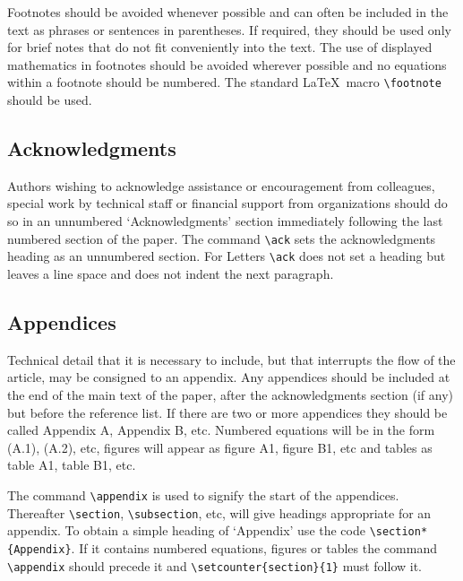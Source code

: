 \documentclass[12pt]{iopart}
\begin{document}
Footnotes should be avoided whenever possible and can often be included in the text as phrases or sentences in parentheses. If required, they should be used only for brief notes that do not fit conveniently into the text. The use of 
displayed mathematics in footnotes should be avoided wherever possible and no equations within a footnote should be numbered. 
The standard \LaTeX\ macro \verb"\footnote" should be used.  

\subsection{Acknowledgments}
Authors wishing to acknowledge assistance or encouragement from 
colleagues, special work by technical staff or financial support from 
organizations should do so in an unnumbered `Acknowledgments' section 
immediately following the last numbered section of the paper. The 
command \verb"\ack" sets the acknowledgments heading as an unnumbered
section. For Letters 
\verb"\ack" does not set a heading but leaves a line space and does not 
indent the next paragraph.

\subsection{Appendices}
Technical detail that it is necessary to include, but that interrupts 
the flow of the article, may be consigned to an appendix. 
Any appendices should be included at the end of the main text of the paper, after the acknowledgments section (if any) but before the reference list.
If there are 
two or more appendices they should be called Appendix A, Appendix B, etc. 
Numbered equations will be in the form (A.1), (A.2), etc,
figures will appear as figure A1, figure B1, etc and tables as table A1,
table B1, etc.

The command \verb"\appendix" is used to signify the start of the
appendices. Thereafter \verb"\section", \verb"\subsection", etc, will 
give headings appropriate for an appendix. To obtain a simple heading of 
`Appendix' use the code \verb"\section*{Appendix}". If it contains
numbered equations, figures or tables the command \verb"\appendix" should
precede it and \verb"\setcounter{section}{1}" must follow it. 
 
\end{document}
